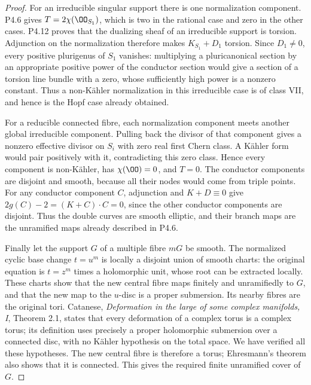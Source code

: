 \begin{proof}
For an irreducible singular support there is one normalization
component. P4.6 gives $T=2\chi(\OO_{S_1})$, which is two in the
rational case and zero in the other cases. P4.12 proves that the
dualizing sheaf of an irreducible support is torsion. Adjunction on
the normalization therefore makes $K_{S_1}+D_1$ torsion. Since
$D_1\ne0$, every positive plurigenus of $S_1$ vanishes: multiplying
a pluricanonical section by an appropriate positive power of the
conductor section would give a section of a torsion line bundle with
a zero, whose sufficiently high power is a nonzero constant. Thus a
non-Kähler normalization in this irreducible case is of class VII,
and hence is the Hopf case already obtained.

For a reducible connected fibre, each normalization component meets
another global irreducible component. Pulling back the divisor of
that component gives a nonzero effective divisor on $S_i$ with zero
real first Chern class. A Kähler form would pair positively with it,
contradicting this zero class. Hence every component is non-Kähler,
has $\chi(\OO)=0$, and $T=0$. The conductor components are disjoint
and smooth, because all their nodes would come from triple points.
For any conductor component $C$, adjunction and $K+D\equiv0$ give
$2g(C)-2=(K+C)\cdot C=0$, since the other conductor components
are disjoint. Thus the double curves are smooth elliptic, and their
branch maps are the unramified maps already described in P4.6.

Finally let the support $G$ of a multiple fibre $mG$ be smooth. The
normalized cyclic base change $t=u^m$ is locally a disjoint union of
smooth charts: the original equation is $t=z^m$ times a holomorphic
unit, whose root can be extracted locally. These charts show that
the new central fibre maps finitely and unramifiedly to $G$, and
that the new map to the $u$-disc is a proper submersion. Its nearby
fibres are the original tori. Catanese, \emph{Deformation in the
large of some complex manifolds, I}, Theorem 2.1, states that every
deformation of a complex torus is a complex torus; its definition
uses precisely a proper holomorphic submersion over a connected
disc, with no Kähler hypothesis on the total space. We have verified
all these hypotheses. The new central fibre is therefore a torus;
Ehresmann's theorem also shows that it is connected. This gives
the required finite unramified cover of $G$.
\end{proof}

